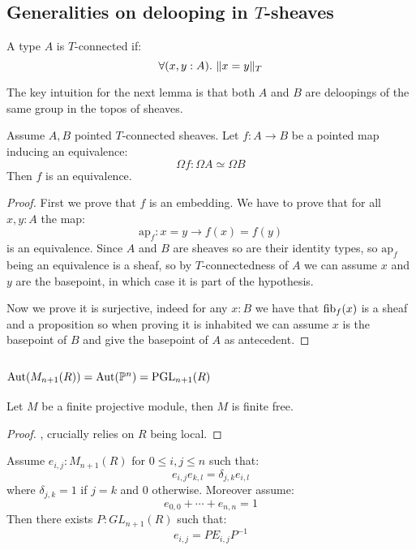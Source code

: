 \subsection{Generalities on delooping in $T$-sheaves}

\begin{definition}
A type $A$ is $T$-connected if:
\[\forall(x,y:A).\ \propTrunc{x=y}_T\]
\end{definition}

The key intuition for the next lemma is that both $A$ and $B$ are deloopings of the same group in the topos of sheaves.

\begin{lemma}\label{deloopings-equivalence}
Assume $A,B$ pointed $T$-connected sheaves. Let $f:A\to B$ be a pointed map inducing an equivalence:
\[\Omega f : \Omega A \simeq \Omega B\]
Then $f$ is an equivalence.
\end{lemma}

\begin{proof}
First we prove that $f$ is an embedding. We have to prove that for all $x,y:A$ the map:
\[\mathrm{ap}_f : x=y \to f(x)=f(y)\]
is an equivalence. Since $A$ and $B$ are sheaves so are their identity types, so $\mathrm{ap}_f$ being an equivalence is a sheaf, so by $T$-connectedness of $A$ we can assume $x$ and $y$ are the basepoint, in which case it is part of the hypothesis.

Now we prove it is surjective, indeed for any $x:B$ we have that $\mathrm{fib}_f(x)$ is a sheaf and a proposition so when proving it is inhabited we can assume $x$ is the basepoint of $B$ and give the basepoint of $A$ as antecedent.
\end{proof}


\subsection{$\mathrm{Aut}(M_{n+1}(R)) = \mathrm{Aut}(\mathbb{P}^n) = \operatorname{PGL}_{n+1}(R)$}

\begin{lemma}\label{finite-projective-free}
Let $M$ be a finite projective module, then $M$ is finite free.
\end{lemma}

\begin{proof}
\cite{TODO}, crucially relies on $R$ being local.
\end{proof}

\begin{lemma}\label{fundamental-system-matrices}
Assume $e_{i,j}:M_{n+1}(R)$ for $0\leq i,j\leq n$ such that:
\[e_{i,j}e_{k,l} = \delta_{j,k}e_{i,l}\]
where $\delta_{j,k} = 1$ if $j=k$ and $0$ otherwise. Moreover assume:
\[e_{0,0}+\cdots+e_{n,n}=1\]
Then there exists $P:GL_{n+1}(R)$ such that:
\[e_{i,j} = PE_{i,j}P^{-1}\]
\end{lemma}

